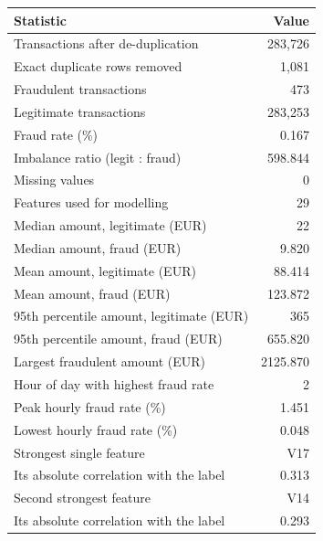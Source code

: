 \begin{tabular}{l r}
\hline
\textbf{Statistic} & \textbf{Value} \\
\hline
Transactions after de-duplication & 283{,}726 \\
Exact duplicate rows removed & 1{,}081 \\
Fraudulent transactions & 473 \\
Legitimate transactions & 283{,}253 \\
Fraud rate (\%) & 0.167 \\
Imbalance ratio (legit : fraud) & 598.844 \\
Missing values & 0 \\
Features used for modelling & 29 \\
Median amount, legitimate (EUR) & 22 \\
Median amount, fraud (EUR) & 9.820 \\
Mean amount, legitimate (EUR) & 88.414 \\
Mean amount, fraud (EUR) & 123.872 \\
95th percentile amount, legitimate (EUR) & 365 \\
95th percentile amount, fraud (EUR) & 655.820 \\
Largest fraudulent amount (EUR) & 2125.870 \\
Hour of day with highest fraud rate & 2 \\
Peak hourly fraud rate (\%) & 1.451 \\
Lowest hourly fraud rate (\%) & 0.048 \\
Strongest single feature & V17 \\
Its absolute correlation with the label & 0.313 \\
Second strongest feature & V14 \\
Its absolute correlation with the label & 0.293 \\
\hline
\end{tabular}